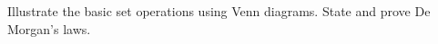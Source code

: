 
\begin{exercise}
\begin{questions}
\question
Illustrate the basic set operations using Venn diagrams.%
\question
State and prove De Morgan's laws.
\end{questions}
\end{exercise}

\endinput
